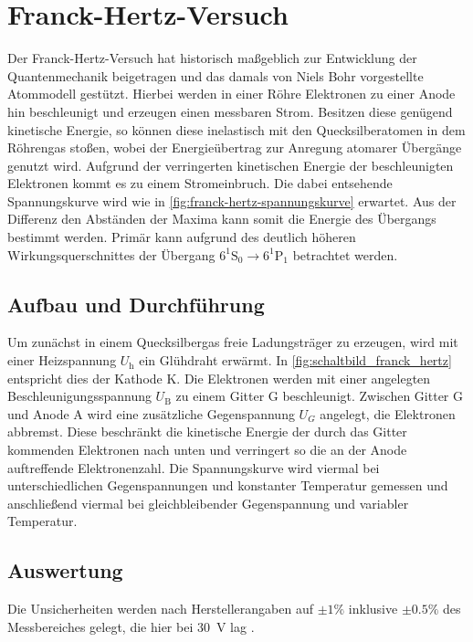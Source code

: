 \section{Franck-Hertz-Versuch}\label{sec:franck-hertz}
Der Franck-Hertz-Versuch hat historisch maßgeblich zur Entwicklung 
der Quantenmechanik beigetragen und das damals von Niels Bohr vorgestellte 
Atommodell gestützt. Hierbei werden in einer Röhre Elektronen zu einer Anode hin 
beschleunigt und erzeugen einen messbaren 
Strom. Besitzen diese genügend kinetische Energie, so können 
diese inelastisch mit den Quecksilberatomen in dem Röhrengas stoßen, 
wobei der Energieübertrag zur Anregung atomarer Übergänge genutzt wird. 
Aufgrund der verringerten kinetischen Energie der beschleunigten Elektronen 
kommt es zu einem Stromeinbruch. Die dabei entsehende Spannungskurve wird 
wie in \cref{fig:franck-hertz-spannungskurve} erwartet. 
Aus der Differenz den Abständen der Maxima kann somit die 
Energie des Übergangs bestimmt werden. Primär kann 
aufgrund des deutlich höheren Wirkungsquerschnittes der Übergang 
${}6^1\mathrm S_0\rightarrow 6^1\mathrm P_1$ betrachtet werden.

\subsection{Aufbau und Durchführung}
Um zunächst in einem Quecksilbergas freie Ladungsträger zu erzeugen, wird mit einer 
Heizspannung $U_\mathrm h$ ein Glühdraht erwärmt. In \cref{fig:schaltbild_franck_hertz} 
entspricht dies der Kathode K. Die Elektronen werden mit einer angelegten Beschleunigungsspannung
$U_\mathrm B$ zu einem Gitter G beschleunigt. 
Zwischen Gitter G und Anode A wird eine zusätzliche Gegenspannung $U_G$ angelegt, die Elektronen 
abbremst. Diese beschränkt die kinetische Energie der durch das Gitter kommenden
Elektronen nach unten und verringert so die an der Anode auftreffende Elektronenzahl.
Die Spannungskurve wird viermal bei unterschiedlichen Gegenspannungen und konstanter Temperatur 
gemessen und anschließend viermal bei gleichbleibender Gegenspannung und variabler 
Temperatur.

\subsection{Auswertung}
Die Unsicherheiten werden nach Herstellerangaben auf $\pm 1\%$ inklusive $\pm 0.5\%$ 
des Messbereiches gelegt, die hier bei \SI{30}{\volt} lag \cite{sensor-cassy}.



